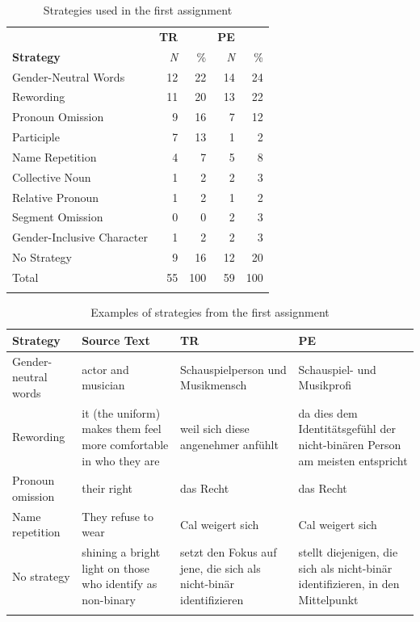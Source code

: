 \begin{table}[!ht]
    \caption{Strategies used in the first assignment}
    \centering
    \begin{tabular}{lrrrr} \lsptoprule
        & \textbf{TR} & & \textbf{PE} &  \\ 
        \textbf{Strategy} & \textit{N} & \% & \textit{N} & \% \\
\midrule
        Gender-Neutral Words & 12 & 22 & 14 & 24 \\ %
        Rewording & 11 & 20 & 13 & 22 \\ %
        Pronoun Omission & 9 & 16 & 7 & 12 \\ %
        Participle & 7 & 13 & 1 & 2 \\ %
        Name Repetition & 4 & 7 & 5 & 8 \\ %
        Collective Noun & 1 & 2 & 2 & 3 \\ %
        Relative Pronoun & 1 & 2 & 1 & 2 \\ %
        Segment Omission & 0 & 0 & 2 & 3 \\ %
        Gender-Inclusive Character & 1 & 2 & 2 & 3 \\ %
        No Strategy & 9 & 16 & 12 & 20 \\ \midrule
        Total & 55 & 100 & 59 & 100 \\
\lspbottomrule
    \end{tabular}
    \label{tab:strategies1}
\end{table}


\begin{table}[!ht]
    \caption{Examples of strategies from the first assignment}
    \centering
    \begin{tabularx}{\textwidth}{QQQQ}
    \lsptoprule
        \textbf{Strategy} & \textbf{Source Text} & \textbf{TR} & \textbf{PE} \\
\midrule
        Gender-neutral words & actor and musician & Schauspielperson und Musikmensch & Schauspiel- und Musikprofi \\
        \tablevspace
        Rewording & it (the uniform) makes them feel more comfortable in who they are & weil sich diese angenehmer anfühlt & da dies dem Identitätsgefühl der nicht-binären Person am meisten entspricht \\
        \tablevspace
        Pronoun omission & their right & das Recht & das Recht \\
        \tablevspace
        Name repetition & They refuse to wear & Cal weigert sich & Cal weigert sich \\
        \tablevspace
        No strategy & shining a bright light on those who identify as non-binary & setzt den Fokus auf jene, die sich als nicht-binär identifizieren & stellt diejenigen, die sich als nicht-binär identifizieren, in den Mittelpunkt \\
\lspbottomrule
    \end{tabularx}
    \label{tab:examples1}
\end{table}

